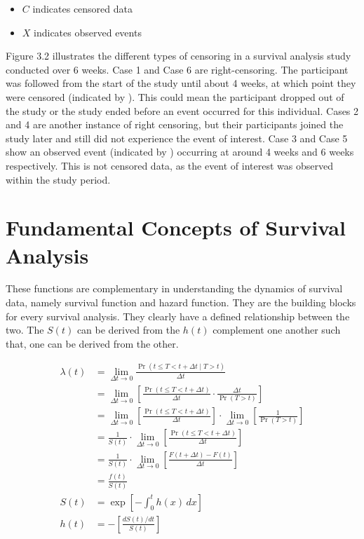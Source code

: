 \documentclass[doublespacing]{report} %
\begin{document}
\begin{itemize}

\item \(C\) indicates censored data
\item  \(X\) indicates observed events


\end{itemize}

Figure 3.2 illustrates the different types of censoring in a survival analysis study conducted over 6 weeks. Case 1 and Case 6 are right-censoring. The participant was followed from the start of the study until about 4 weeks, at which point they were censored (indicated by ). This could mean the participant dropped out of the study or the study ended before an event occurred for this individual. Cases 2 and 4 are another instance of right censoring, but their participants joined the study later and still did not experience the event of interest. Case 3 and Case 5 show an observed event (indicated by ) occurring at around 4 weeks and 6 weeks respectively. This is not censored data, as the event of interest was observed within the study period.

\section{Fundamental Concepts of Survival Analysis}

These functions are complementary in understanding the dynamics of survival data, namely survival function and hazard function. They are the building blocks for every survival analysis. They clearly have a defined relationship between the two. The \(S\left(t\right)\) can be derived from the \(h\left(t\right)\) complement one another such that, one can be derived from the other.

\begin{align}
\lambda(t) &= \lim_{\Delta t \to 0} \frac{\Pr(t \leq T < t + \Delta t \mid T > t)}{\Delta t} \\
&= \lim_{\Delta t \to 0} \left[ \frac{\Pr(t \leq T < t + \Delta t)}{\Delta t} \cdot \frac{\Delta t}{\Pr(T > t)} \right] \\
&= \lim_{\Delta t \to 0} \left[ \frac{\Pr(t \leq T < t + \Delta t)}{\Delta t} \right] \cdot \lim_{\Delta t \to 0} \left[ \frac{1}{\Pr(T > t)} \right] \\
&= \frac{1}{S(t)} \cdot \lim_{\Delta t \to 0} \left[ \frac{\Pr(t \leq T < t + \Delta t)}{\Delta t} \right] \\
&= \frac{1}{S(t)} \cdot \lim_{\Delta t \to 0} \left[ \frac{F(t + \Delta t) - F(t)}{\Delta t} \right] \\
&= \frac{f(t)}{S(t)}\\
S(t) &= \exp\left[-\int_{0}^{t} h(x) \, dx\right]\\
h(t) &= -\left[\frac{dS(t)/dt}{S(t)}\right]
\end{align}
\end{document}
